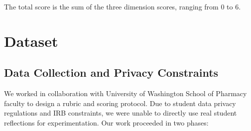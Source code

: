 \documentclass[11pt]{article}
\begin{document}
The total score is the sum of the three dimension scores, ranging from 0 to 6.



\section{Dataset}



\subsection{Data Collection and Privacy Constraints}

We worked in collaboration with University of Washington School of Pharmacy faculty to design a rubric and scoring protocol. Due to student data privacy regulations and IRB constraints, we were unable to directly use real student reflections for experimentation. Our work proceeded in two phases:
\end{document}
